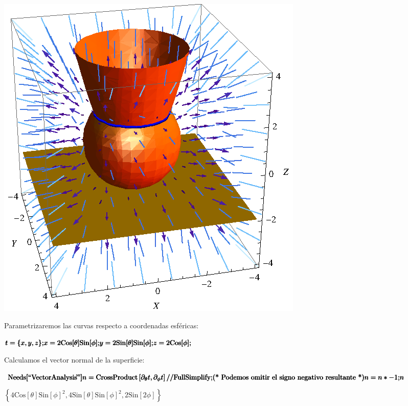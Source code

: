 \documentclass{article}
\begin{document}
\includegraphics{lab3_gr1.eps}

Parametrizaremos las curvas respecto a coordenadas esf{\' e}ricas:

\begin{doublespace}
\noindent\(\pmb{t=\{x,y,z\};}\\
\pmb{x=2\text{Cos}[\theta ]\text{Sin}[\phi ];}\\
\pmb{y=2\text{Sin}[\theta ]\text{Sin}[\phi ];}\\
\pmb{z=2\text{Cos}[\phi ];}\)
\end{doublespace}

Calculamos el vector normal de la superficie:

\begin{doublespace}
\noindent\(\pmb{\text{Needs}[\text{{``}VectorAnalysis$\grave{ }${''}}]}\\
\pmb{n=\text{CrossProduct}\left[\partial _{\theta }t,\partial _{\phi }t\right]\text{//}\text{FullSimplify} ;}\\
\pmb{\text{(* Podemos omitir el signo negativo resultante *)}}\\
\pmb{n=n*-1; }\\
\pmb{n}\)
\end{doublespace}

\begin{doublespace}
\noindent\(\left\{4 \text{Cos}[\theta ] \text{Sin}[\phi ]^2,4 \text{Sin}[\theta ] \text{Sin}[\phi ]^2,2 \text{Sin}[2 \phi ]\right\}\)
\end{doublespace}
\end{document}
